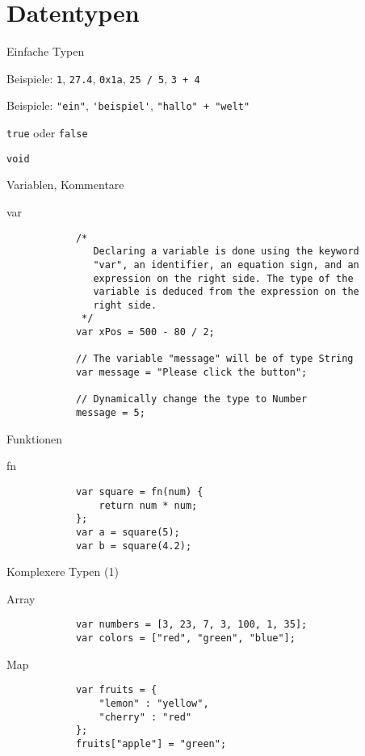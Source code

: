\documentclass[ucs,9pt]{beamer}
\begin{document}
\section{Datentypen}
\begin{frame}[fragile]{Einfache Typen}
\begin{description}
	\addtolength{\itemsep}{\baselineskip}
	\item[Number] Beispiele: \lstinline!1!, \lstinline!27.4!, \lstinline!0x1a!, \lstinline!25 / 5!, \lstinline!3 + 4!
	\item[String] Beispiele: \lstinline!"ein"!, \lstinline!'beispiel'!, \lstinline!"hallo" + "welt"!
	\item[Bool] \lstinline!true! oder \lstinline!false!
	\item[Void] \lstinline!void!
\end{description}
\end{frame}

\begin{frame}[fragile]{Variablen, Kommentare}
	\begin{block}{var}
		\begin{lstlisting}
			/*
			   Declaring a variable is done using the keyword
			   "var", an identifier, an equation sign, and an
			   expression on the right side. The type of the
			   variable is deduced from the expression on the
			   right side.
			 */
			var xPos = 500 - 80 / 2;

			// The variable "message" will be of type String
			var message = "Please click the button";

			// Dynamically change the type to Number
			message = 5;
		\end{lstlisting}
	\end{block}
\end{frame}

\begin{frame}[fragile]{Funktionen}
	\begin{block}{fn}
		\begin{lstlisting}
			var square = fn(num) {
			    return num * num;
			};
			var a = square(5);
			var b = square(4.2);
		\end{lstlisting}
	\end{block}
\end{frame}

\begin{frame}[fragile]{Komplexere Typen (1)}
	\begin{block}{Array}
		\begin{lstlisting}
			var numbers = [3, 23, 7, 3, 100, 1, 35];
			var colors = ["red", "green", "blue"];
		\end{lstlisting}
	\end{block}
	\begin{block}{Map}
		\begin{lstlisting}
			var fruits = {
			    "lemon" : "yellow",
			    "cherry" : "red"
			};
			fruits["apple"] = "green";
		\end{lstlisting}
	\end{block}
\end{frame}
\end{document}
